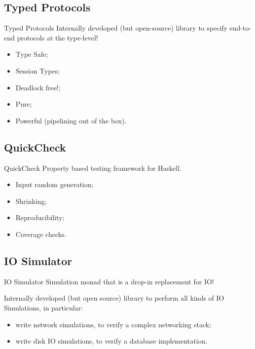 \documentclass{beamer}
\begin{document}
\subsection*{Typed Protocols}

\begin{frame}{Typed Protocols}
  Internally developed (but open-source) library to specify end-to-end protocols at the type-level!

  \begin{itemize}
    \item Type Safe;
    \item Session Types;
    \item \alert{Deadlock free!};
    \item Pure;
    \item Powerful (pipelining out of the box).
  \end{itemize}

\end{frame}

\subsection*{QuickCheck}

\begin{frame}{QuickCheck}
  Property based testing framework for Haskell.

  \begin{itemize}
    \item \alert{Input random generation};
    \item Shrinking;
    \item \alert{Reproducibility};
    \item Coverage checks.
  \end{itemize}

\end{frame}

\subsection*{IO Simulator}
\begin{frame}{IO Simulator}
  Simulation monad that is a drop-in \alert{replacement} for IO!

  Internally developed (but open source) library to perform all kinds of \alert{IO
  Simulations}, in particular:

  \begin{itemize}
    \item write \alert{network simulations}, to verify a complex networking stack;
    \item write \alert{disk IO simulations}, to verify a database implementation.
  \end{itemize}
\end{frame}
\end{document}
